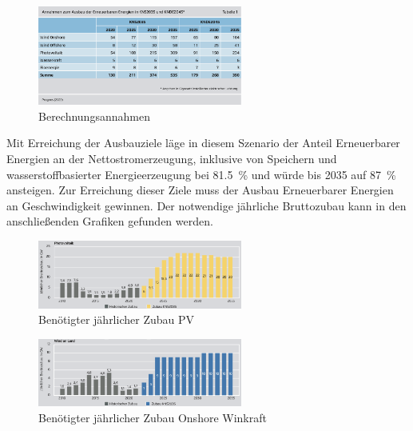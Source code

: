 		\begin{figure}[H]
			\centering
			\includegraphics[page=1, width=0.6\textwidth]{./anhang/Annahmen Agora2035.png}
			\caption{Berechnungsannahmen}
			\label{Abb. Annahmen Agora2035}
		\end{figure}
	
		Mit Erreichung der Ausbauziele läge in diesem Szenario der Anteil Erneuerbarer Energien an der Nettostromerzeugung, inklusive von Speichern und wasserstoffbasierter Energieerzeugung bei \SI{81,5}{\percent} und würde bis 2035 auf \SI{87}{\percent} ansteigen. Zur Erreichung dieser Ziele muss der Ausbau Erneuerbarer Energien an Geschwindigkeit gewinnen. Der notwendige jährliche Bruttozubau kann in den anschließenden Grafiken gefunden werden.\\
			
			\begin{figure}[H]
				\centering
				\includegraphics[page=1, clip, width=0.6\textwidth]{./anhang/Zubau PV Agora2035.png}
				\caption{Benötigter jährlicher Zubau PV}
				\label{Abb.Zubau PV Agora2035}
			\end{figure}
			
				\begin{figure}[H]
				\centering
				\includegraphics[page=1, clip, width=0.6\textwidth]{./anhang/Zubau Onshore Agora2035.png}
				\caption{Benötigter jährlicher Zubau Onshore Winkraft}
				\label{Abb.Zubau Onshore Agora2035}
			\end{figure}
		
